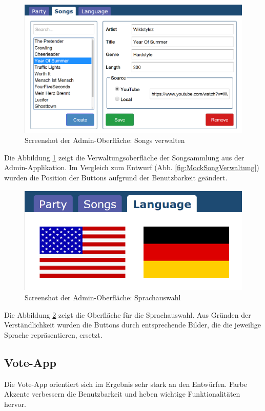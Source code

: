 \begin{figure}[H]
\centering
\includegraphics[width=0.9\linewidth]{Bilder/Screenshot-Admin-Songs}
\caption{Screenshot der Admin-Oberfläche: Songs verwalten}
\label{fig:Screenshot-Admin-Songs}
\end{figure}

Die Abbildung \ref{fig:Screenshot-Admin-Songs} zeigt die Verwaltungsoberfläche der Songsammlung aus der Admin-Applikation. Im Vergleich zum Entwurf (Abb. \ref{fig:MockSongVerwaltung}) wurden die Position der Buttons aufgrund der Benutzbarkeit geändert.

\begin{figure}[H]
\centering
\includegraphics[width=0.5\linewidth]{Bilder/Screenshot-Admin-Language}
\caption{Screenshot der Admin-Oberfläche: Sprachauswahl}
\label{fig:Screenshot-Admin-Language}
\end{figure}

Die Abbildung \ref{fig:Screenshot-Admin-Language} zeigt die Oberfläche für die Sprachauswahl. Aus Gründen der Verständlichkeit wurden die Buttons durch entsprechende Bilder, die die jeweilige Sprache repräsentieren, ersetzt.

\subsection{Vote-App}
Die Vote-App orientiert sich im Ergebnis sehr stark an den Entwürfen. Farbe Akzente verbessern die Benutzbarkeit und heben wichtige Funktionalitäten hervor.

